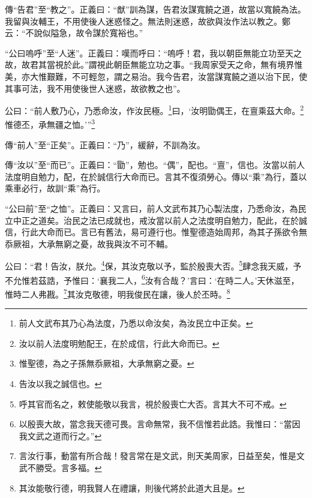 {\noindent\zhuan{}\fzbyks 傳“告君”至“教之”。正義曰：“猷”訓為謀，告君汝謀寬饒之道，故當以寬饒為法。我留與汝輔王，不用使後人迷惑怪之。無法則迷惑，故欲與汝作法以教之。鄭云：“不說似隘急，故令謀於寬裕也。” \par}

{\noindent\shu{}\fzkt “公曰嗚呼”至“人迷”。正義曰：嘆而呼曰：“嗚呼！君，我以朝臣無能立功至天之故，故君其當視於此。”謂視此朝臣無能立功之事。“我周家受天之命，無有境界惟美，亦大惟艱難，不可輕忽，謂之易治。我今告君，汝當謀寬饒之道以治下民，使其事可法，我不用使後世人迷惑，故欲教之也”。 \par}

公曰：“前人敷乃心，乃悉命汝，作汝民極。\footnote{前人文武布其乃心為法度，乃悉以命汝矣，為汝民立中正矣。}曰，‘汝明勖偶王，在亶乘茲大命。\footnote{汝以前人法度明勉配王，在於成信，行此大命而已。}惟德丕，承無疆之恤。’”\footnote{惟聖德，為之子孫無忝厥祖，大承無窮之憂。}


{\noindent\zhuan{}\fzbyks 傳“前人”至“正矣”。正義曰：“乃”，緩辭，不訓為汝。 \par}

{\noindent\zhuan{}\fzbyks 傳“汝以”至“而已”。正義曰：“勖”，勉也。“偶”，配也。“亶”，信也。汝當以前人法度明自勉力，配，在於誠信行大命而已。言其不復須勞心。傳以“乘”為行，蓋以乘車必行，故訓“乘”為行。 \par}

{\noindent\shu{}\fzkt “公曰前”至“之恤”。正義曰：又言曰，前人文武布其乃心製法度，乃悉命汝，為民立中正之道矣。治民之法已成就也，戒汝當以前人之法度明自勉力，配此，在於誠信，行此大命而已。言已有舊法，易可遵行也。惟聖德造始周邦，為其子孫欲令無忝厥祖，大承無窮之憂，故我與汝不可不輔。 \par}

公曰：“君！告汝，朕允。\footnote{告汝以我之誠信也。}保，其汝克敬以予，監於殷喪大否。\footnote{呼其官而名之，敕使能敬以我言，視於殷喪亡大否。言其大不可不戒。}肆念我天威，予不允惟若茲誥，予惟曰：‘襄我二人，\footnote{以殷喪大故，當念我天德可畏。言命無常，我不信惟若此誥。我惟曰：“當因我文武之道而行之。”}汝有合哉？’言曰：‘在時二人。’天休滋至，惟時二人弗戡。\footnote{言汝行事，動當有所合哉！發言常在是文武，則天美周家，日益至矣，惟是文武不勝受。言多福。}其汝克敬德，明我俊民在讓，後人於丕時。\footnote{其汝能敬行德，明我賢人在禮讓，則後代將於此道大且是。}


